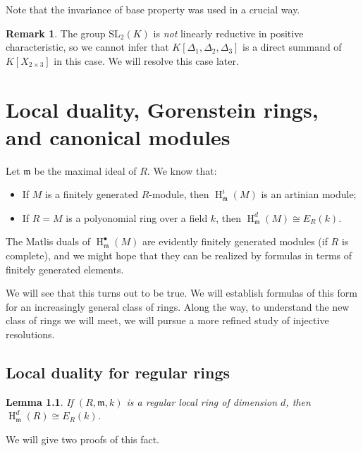 \documentclass[11pt]{book}
\newtheorem{lemma}[theorem]{Lemma}
\numberwithin{equation}{section}
\numberwithin{theorem}{chapter}
\theoremstyle{definition}
\newtheorem*{basic properties}{Basic Properties}
\newtheorem*{Important Remark}{Important Remark}
\newtheorem{remark}[theorem]{Remark}
\theoremstyle{remark}
\newcommand{\m}{\mathfrak{m}}
\renewcommand{\H}{\operatorname{H}}
\begin{document}
Note that the invariance of base property was used in a crucial way.

\begin{remark}
	The group $\mathrm{SL}_2(K)$ is \emph{not} linearly reductive in positive characteristic, so we cannot infer that $K[\Delta_1,\Delta_2,\Delta_3]$ is a direct summand of $K[X_{2\times 3}]$ in this case. We will resolve this case later.
\end{remark}




\chapter{Local duality, Gorenstein rings, and canonical modules}

Let $\m$ be the maximal ideal of $R$. We know that:
\begin{itemize}
	\item If $M$ is a finitely generated $R$-module, then $\H^i_\m(M)$ is an artinian module;
	\item  If $R=M$ is a polyonomial ring over a field $k$, then $\H^d_\m(M) \cong E_R(k)$.
\end{itemize}
The Matlis duals of $\H^\bullet_\m(M)$ are evidently finitely generated modules (if $R$ is complete), and we might hope that they can be realized by formulas in terms of finitely generated elements.

We will see that this turns out to be true. We will establish formulas of this form for an increasingly general class of rings. Along the way, to understand the new class of rings we will meet, we will pursue a more refined study of injective resolutions.

\section{Local duality for regular rings}

\begin{lemma}
	If $(R,\m,k)$ is a regular local ring of dimension $d$, then $\H^d_\m(R) \cong E_R(k)$.
\end{lemma}

We will give two proofs of this fact.
\end{document}
